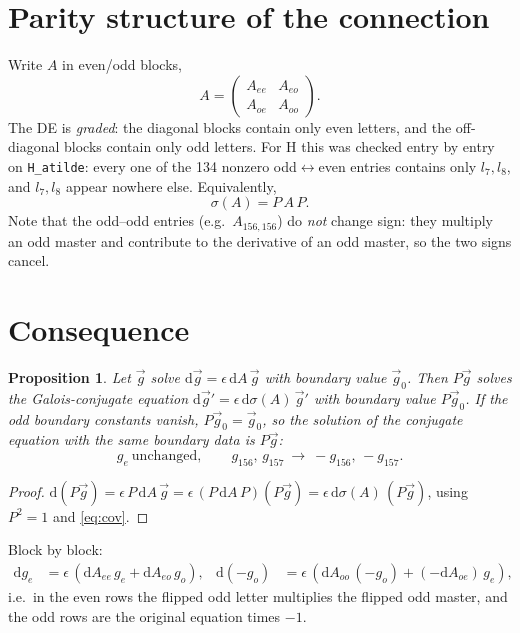 \documentclass[11pt]{article}
\newtheorem{prop}{Proposition}
\newcommand{\dd}{\mathrm{d}}
\begin{document}
\section{Parity structure of the connection}
Write $A$ in even/odd blocks,
\begin{equation}
  A=\begin{pmatrix} A_{ee} & A_{eo}\\ A_{oe} & A_{oo}\end{pmatrix}.
\end{equation}
The DE is \emph{graded}: the diagonal blocks contain only even letters, and the off-diagonal
blocks contain only odd letters. For H this was checked entry by entry on
\texttt{H\_atilde}: every one of the 134 nonzero odd$\leftrightarrow$even entries contains only
$l_7,l_8$, and $l_7,l_8$ appear nowhere else. Equivalently,
\begin{equation}
  \sigma(A) = P\,A\,P .
  \label{eq:cov}
\end{equation}
Note that the odd--odd entries (e.g.\ $A_{156,156}$) do \emph{not} change sign: they multiply an
odd master and contribute to the derivative of an odd master, so the two signs cancel.

\section{Consequence}
\begin{prop}
Let $\vec g$ solve $\dd\vec g=\epsilon\,\dd A\,\vec g$ with boundary value $\vec g_0$. Then
$P\vec g$ solves the Galois-conjugate equation $\dd\vec g'=\epsilon\,\dd\sigma(A)\,\vec g'$
with boundary value $P\vec g_0$. If the odd boundary constants vanish, $P\vec g_0=\vec g_0$,
so the solution of the conjugate equation with the same boundary data is $P\vec g$:
\begin{equation}
  g_e\ \text{unchanged},\qquad g_{156},\,g_{157}\ \to\ -g_{156},\,-g_{157}.
\end{equation}
\end{prop}
\begin{proof}
$\dd(P\vec g)=\epsilon\,P\,\dd A\,\vec g=\epsilon\,(P\,\dd A\,P)(P\vec g)=\epsilon\,\dd\sigma(A)\,(P\vec g)$,
using $P^2=1$ and \eqref{eq:cov}.
\end{proof}
Block by block:
\begin{align}
  \dd g_e &= \epsilon\,(\dd A_{ee}\, g_e + \dd A_{eo}\, g_o), &
  \dd(-g_o) &= \epsilon\,(\dd A_{oo}\,(-g_o) + (-\dd A_{oe})\, g_e),
\end{align}
i.e.\ in the even rows the flipped odd letter multiplies the flipped odd master, and the odd
rows are the original equation times $-1$.
\end{document}
